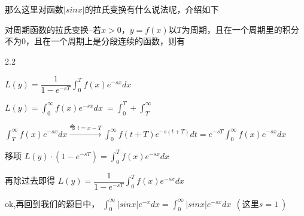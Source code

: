 \documentclass[12pt]{report}
\begin{document}
  那么这里对函数$|sinx|$的拉氏变换有什么说法呢，介绍如下
  
   对周期函数的拉氏变换--若$x>0$，$y=f(x)$以$T$为周期，且在一个周期里的积分不为0，且在一个周期上是分段连续的函数，则有
  
   \vspace{-10pt}
  
  \begin{spacing}{2.2}
  	\begin{center}
  		$L\left(y\right)=\dfrac{1}{1-e^{-sT}}\int_{0}^{T}f\left(x\right)e^{-sx}dx\:$
  		
  		\hspace{-4em}  \hspace{1em}	$L\left(y\right)=\int_{0}^{\infty}f\left(x\right)e^{-sx}dx\:=\int_{0}^{T}+\int_{T}^{\infty}$
  		
  		$\int_{T}^{\infty} f(x) e^{-sx} dx \xrightarrow{\text{令 } t=x-T} \int_{0}^{\infty} f(t+T) e^{-s(t+T)} dt =e^{-sT}\int_{0}^{\infty}f\left(x\right)e^{-sx}dx\:$
  		
  		\hspace{-4em} 移项 \hspace{2em} $L\left(y\right)\cdot\left(1-e^{-sT}\right)=\int_{0}^{T}f\left(x\right)e^{-sx}dx\:$
  		
  		\hspace{-8em} 再除过去即得 \hspace{2em} $L\left(y\right)=\dfrac{1}{1-e^{-sT}}\int_{0}^{T}f\left(x\right)e^{-sx}dx\:$
  	\end{center}
  \end{spacing}
  
  
  ok,再回到我们的题目中，	$\int_{0}^{\infty}\left|sinx\right|e^{-x}dx=\int_{0}^{\infty}\left|sinx\right|e^{-sx}dx\:\:\left(这里s=1\:\right)$
  
  \vspace{10pt}
  
\end{document}
